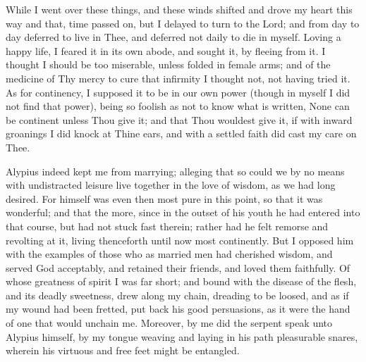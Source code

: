 \documentclass[b5paper,openright,12pt,twoside]{book}
\begin{document}
While I went over these things, and these winds shifted and drove my
heart this way and that, time passed on, but I delayed to turn to the
Lord; and from day to day deferred to live in Thee, and deferred not
daily to die in myself. Loving a happy life, I feared it in its own
abode, and sought it, by fleeing from it. I thought I should be too
miserable, unless folded in female arms; and of the medicine of Thy
mercy to cure that infirmity I thought not, not having tried it. As for
continency, I supposed it to be in our own power (though in myself I did
not find that power), being so foolish as not to know what is written,
None can be continent unless Thou give it; and that Thou wouldest give
it, if with inward groanings I did knock at Thine ears, and with a
settled faith did cast my care on Thee.

Alypius indeed kept me from marrying; alleging that so could we by no
means with undistracted leisure live together in the love of wisdom, as
we had long desired. For himself was even then most pure in this point,
so that it was wonderful; and that the more, since in the outset of his
youth he had entered into that course, but had not stuck fast therein;
rather had he felt remorse and revolting at it, living thenceforth until
now most continently. But I opposed him with the examples of those who
as married men had cherished wisdom, and served God acceptably, and
retained their friends, and loved them faithfully. Of whose greatness of
spirit I was far short; and bound with the disease of the flesh, and its
deadly sweetness, drew along my chain, dreading to be loosed, and as if
my wound had been fretted, put back his good persuasions, as it were the
hand of one that would unchain me. Moreover, by me did the serpent
speak unto Alypius himself, by my tongue weaving and laying in his
path pleasurable snares, wherein his virtuous and free feet might be
entangled.
\end{document}
